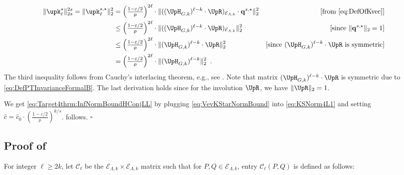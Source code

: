 \documentclass[11pt,reqno]{amsart}
\numberwithin{equation}{section}
\newcommand{\cC}{{\mathcal{C}}}
\newcommand{\cE}{{\mathcal{E}}}
\newcommand{\applegreen}[1]{ {\color{applegreen}#1}}
\newcommand{\amethyst}[1]{{\color{amethyst}#1} }
\newcommand{\bluepigment}[1]{{\color{blue(pigment)}#1}}
\newcommand{\cadmiumgreen}[1]{{\color{cadmiumgreen}#1}}
\newcommand{\darkmagenta}[1]{{\color{darkmagenta}#1}}
\newcommand{\goldenbrown}[1]{{\color{goldenbrown}#1}}
\newcommand{\iris}[1]{{\color{iris}#1}}
\newcommand{\ExtV}{\iris{\cE}}
\newcommand{\pfs}{\darkmagenta{s}}
\newcommand{\norm}[2]{\goldenbrown{\|} #1 \goldenbrown{\|}_{#2}}
\newcommand{\nnorm}[3]{\goldenbrown{\|} #1\goldenbrown{\|}^{#2}_{#3}}
\newcommand{\NBMatrix}{\cadmiumgreen{\UpH}_{G,\kk}}
\newcommand{\Invol}{\UpR}
\renewcommand{\applegreen}[1]{#1}
\renewcommand{\amethyst}[1]{#1}
\renewcommand{\bluepigment}[1]{#1}
\renewcommand{\cadmiumgreen}[1]{#1}
\renewcommand{\darkmagenta}[1]{#1}
\renewcommand{\goldenbrown}[1]{#1}
\renewcommand{\iris}[1]{#1}
\newcommand{\kk}{\bluepigment{k}}
\newcommand{\kell}{{\color{green(pigment)}\ell}}%
\newcommand{\kP}{\goldenbrown{P}}
\newcommand{\kQ}{\amethyst{Q}}
\renewcommand{\kk}{k}
\renewcommand{\kell}{\ell}
\renewcommand{\kP}{P}
\renewcommand{\kQ}{Q}
\newcommand{\SingBound}{\uprho}
\begin{document}
\begin{align}
\nnorm{ \vecK^{\star}_{\kell}}{2\pfs}{2\pfs}=\nnorm{ \vecK^{\pfs,\star}_{\kell}}{2}{2} &=
 {\textstyle \left(\frac{1-\varepsilon/2}{\SingBound}\right)^{2\kell}} \cdot %
\nnorm{   ( ( \NBMatrix)^{{\kell-\kk}}\cdot \Invol )_{\ExtV_{\Lambda,\kk}} \cdot \vtest^{\pfs, \star}  }{2}{2} 
 &\textrm{[from \eqref{eq:DefOfKvec}]}\nonumber \\
 &\leq {\textstyle \left(\frac{1-\varepsilon/2}{\SingBound}\right)^{2\kell}} \cdot %
 \nnorm{ {\textstyle ( ( \NBMatrix)^{{\kell-\kk}}\cdot \Invol )_{\ExtV_{\Lambda, \kk}}}}{2}{2} &
 \textrm{[since $\norm{ \vtest^{\pfs,\star}}{2}=1$]}\nonumber \\
&\leq {\textstyle \left(\frac{1-\varepsilon/2}{\SingBound}\right)^{2 \kell}} \cdot %
\nnorm{ ( \NBMatrix)^{{\kell-\kk}}\cdot \Invol }{2}{2} & \textrm{[since $(\NBMatrix)^{\kell-\kk}\cdot \Invol$ is symmetric]} \nonumber \\
&= {\textstyle \left(\frac{1-\varepsilon/2}{\SingBound}\right)^{2\kell}} \cdot
\nnorm{ ( \NBMatrix)^{{\kell-\kk}}}{2}{2}
\enspace. \label{eq:VevKStarNormBound}
\end{align}
The third inequality follows from Cauchy’s interlacing theorem, e.g., see \cite{MatrixAnalysis}.
Note that   matrix $(\NBMatrix)^{\kell-\kk} \cdot \Invol$ is symmetric  due to \eqref{eq:DefPTInvarianceFormalB}.
%
The last derivation holds since for the involution $ \Invol$, we have $\norm{ \Invol}{2}=1$. 

We get \eqref{eq:Target4thrm:InfNormBoundHConjLL} by plugging \eqref{eq:VevKStarNormBound} into \eqref{eq:KSNorm4L1}
and setting $\widehat{c}=\widehat{c}_0\cdot \left(\frac{1-\varepsilon/2}{\SingBound}\right)^{\kk/\pfs}$. 
%
  follows. 
%
 \hfill $\square$


\newcommand{\SimpleExtdInfMatrixL}{\cC}
\newcommand{\SimpleFvec}{\upz}



\subsection{Proof of }\label{sec:thrm:HC-VEntryBound}


For integer $\kell\geq 2\kk$, let $\SimpleExtdInfMatrixL_{\kell}$ be the $\ExtV_{\Lambda,\kk}\times \ExtV_{\Lambda,\kk}$ matrix 
such that for $\kP,\kQ \in \ExtV_{\Lambda,\kk}$, entry $\SimpleExtdInfMatrixL_{\kell}(\kP,\kQ)$ is defined as follows:
\end{document}
